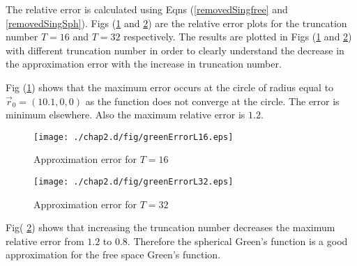 \par 
The relative  error is calculated using Eqns (\ref{removedSingfree} and \ref{removedSingSph}). Figs (\ref{errorGreenL16} and   \ref{errorGreenL32}) are the relative error plots for the truncation number $T =16$ and $T =32$ respectively.    The results are plotted in  Figs (\ref{errorGreenL16} and  \ref{errorGreenL32})  with different truncation number in order to  clearly understand the decrease in the approximation error  with the increase in truncation number. 
\par
Fig (\ref{errorGreenL16}) shows that the maximum error occurs at the circle of radius equal to $\vec{r}_0=(10.1,0,0)$ as the function does not converge at the circle. The error is minimum elsewhere. Also the maximum relative error is $1.2$.
\begin{figure}[h!]
\begin{center}
\texttt{[image: ./chap2.d/fig/greenErrorL16.eps]}
\caption{Approximation error for $T = 16$}
\label{errorGreenL16}
\end{center}
\end {figure}
\newpage
\begin{figure}[h!]
\begin{center}
\texttt{[image: ./chap2.d/fig/greenErrorL32.eps]}
\caption{Approximation error for $T = 32$}
\label{errorGreenL32}
\end{center}
\end {figure}

Fig( \ref{errorGreenL32}) shows that increasing the truncation number decreases  the maximum relative error from $1.2$ to $0.8$. Therefore the spherical Green's function is a good approximation for the free space Green's function. 

\newpage
